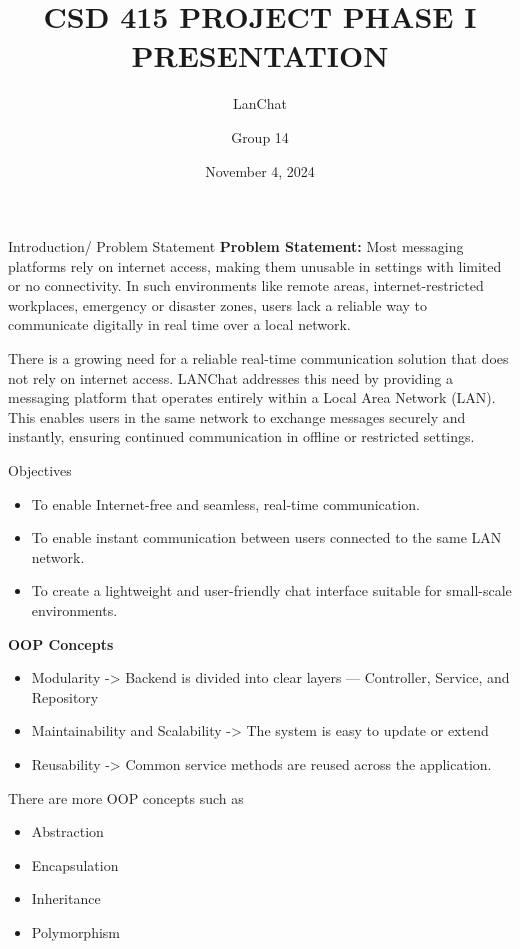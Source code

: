 \documentclass[aspectratio=1610]{beamer}
\title{CSD 415 PROJECT PHASE I PRESENTATION}
\subtitle{LanChat}
\author{Group 14}
\date{November 4, 2024}
\begin{document}
\begin{frame}
  \titlepage
\end{frame}

\begin{frame}{Introduction/ Problem Statement}
\small
\vspace{0.2cm}
\textbf{Problem Statement: }Most messaging platforms rely on internet access, making them unusable in settings with limited or no connectivity. In such environments like remote areas, internet-restricted workplaces, emergency or disaster zones, users lack a reliable way to communicate digitally in real time over a local network.
\vspace{0.3cm}

There is a growing need for a reliable real-time communication solution that does not rely on internet access. LANChat addresses this need by providing a messaging platform that operates entirely within a Local Area Network (LAN). This enables users in the same network to exchange messages securely and instantly, ensuring continued communication in offline or restricted settings.
\end{frame}

\begin{frame}{Objectives}
\small
\vspace{0.2cm}
\begin{itemize}
   \item To enable Internet-free and seamless, real-time communication.
   \item To enable instant communication between users connected to the same LAN network.
   \item To create a lightweight and user-friendly chat interface suitable for small-scale environments.
\end{itemize}
\textbf{OOP Concepts}
\begin{itemize}
    \item Modularity -> 
Backend is divided into clear layers — Controller, Service, and Repository
    \item Maintainability and Scalability -> 
The system is easy to update or extend
    \item Reusability -> 
Common service methods are reused across the application.
\end{itemize}
There are more OOP concepts such as
\begin{itemize}
    \item Abstraction
    \item Encapsulation
    \item Inheritance
    \item Polymorphism
\end{itemize}

\end{frame}
\end{document}
